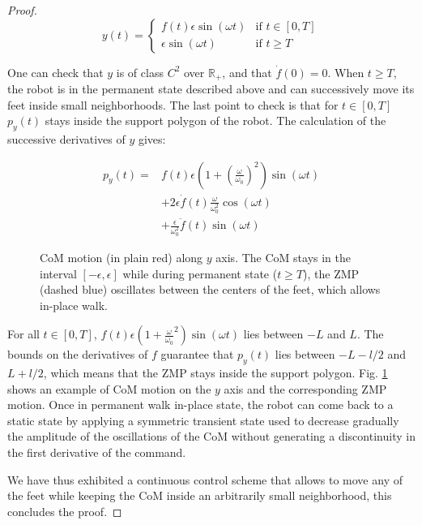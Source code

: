 \documentclass{article}
\begin{document}
\begin{proof}
\[
y(t) = \left\{
\begin{array}{ll}
f(t)\epsilon\sin(\omega t) 
& \text{if } t\in [0,T]
\\ 
\epsilon\sin(\omega t) 
& \text{if } t \geq T \end{array}
\right.
\]

One can  check that $y$  is of class $C^2$ over  $\mathbb{R}_+$, and
that $\dot{f}(0) = 0$. When $t\geq T$, the robot is in the permanent
state described above  and can successively move its feet  inside small neighborhoods.
The  last point to check
is that for $t \in  [0,T]$ $p_y(t)$ stays inside the support polygon
of the robot. The calculation of the successive derivatives of $y$ gives:

\[
\begin{array}{cl}
p_y(t) = &  f(t) \epsilon (1 + \left(\frac{\omega}{\omega_0}\right)^2)
\sin (\omega  t) \\ &  + 2\epsilon \dot{f}(t)\frac{\omega}{\omega_0^2}
\cos  (\omega t)  \\ &  +  \frac{\epsilon}{\omega_0^2}\ddot{f}(t) \sin
(\omega t)
\end{array}
\]



\begin{figure}
\centering


\caption{CoM motion (in plain red) along $y$ axis.  The CoM stays in the interval
  $[-\epsilon,\epsilon]$ while during  permanent state ($t \geq T$),
  the ZMP (dashed blue) oscillates between the centers of the feet, which allows
  in-place walk.}
\label{fig:zmp-inplace}
\end{figure}

For    all     $t    \in    [0,T]$,    $f(t)     \epsilon    (1    +
\frac{\omega}{\omega_0}^2)  \sin  (\omega t)$  lies  between $-L$  and
$L$. The bounds on the derivatives of $f$ guarantee that $p_y(t)$ lies
between  $-L- l/2$ and  $L+ l/2$,  which means  that the  ZMP stays
inside  the  support  polygon.  Fig.  \ref{fig:zmp-inplace}  shows  an
example  of CoM  motion  on the  $y$  axis and  the corresponding  ZMP
motion. Once in permanent walk in-place state, the robot can come back
to  a static  state by  applying a  symmetric transient  state  used to
decrease  gradually  the amplitude  of  the  oscillations  of the  CoM
without  generating a  discontinuity in  the first  derivative  of the
command.


We have thus exhibited a continuous control scheme that allows to move any of the feet
while keeping the CoM inside an arbitrarily small neighborhood, this concludes
the proof.
\end{proof}
\end{document}
